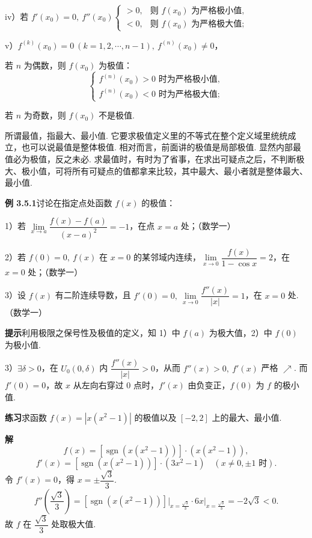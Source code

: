 \documentclass[UTF8,12pt,a4paper,fontset=fandol]{ctexart}
\begin{document}
iv）若 $f'(x_0)=0,\ f''(x_0)
\begin{cases}
>0, & \text{则 }f(x_0)\text{ 为严格极小值},\\
<0, & \text{则 }f(x_0)\text{ 为严格极大值};
\end{cases}$

v）$f^{(k)}(x_0)=0\ (k=1,2,\cdots,n-1),\ f^{(n)}(x_0)\ne0$，

若 $n$ 为偶数，则 $f(x_0)$ 为极值：
\[
\begin{cases}
f^{(n)}(x_0)>0\text{ 时为严格极小值},\\
f^{(n)}(x_0)<0\text{ 时为严格极大值};
\end{cases}
\]

若 $n$ 为奇数，则 $f(x_0)$ 不是极值.

所谓最值，指最大、最小值. 它要求极值定义里的不等式在整个定义域里统统成立，也可以说最值是整体极值. 相对而言，前面讲的极值是局部极值. 显然内部最值必为极值，反之未必. 求最值时，有时为了省事，在求出可疑点之后，不判断极大、极小值，可将所有可疑点的值都拿来比较，其中最大、最小者就是整体最大、最小值.

\noindent\textbf{例 3.5.1}\quad 讨论在指定点处函数 $f(x)$ 的极值：

1）若 $\lim\limits_{x\to a}\dfrac{f(x)-f(a)}{(x-a)^2}=-1$，在点 $x=a$ 处；（数学一）

2）若 $f(0)=0,\ f(x)$ 在 $x=0$ 的某邻域内连续，$\lim\limits_{x\to0}\dfrac{f(x)}{1-\cos x}=2$，在 $x=0$ 处；（数学一）

3）设 $f(x)$ 有二阶连续导数，且 $f'(0)=0,\ \lim\limits_{x\to0}\dfrac{f''(x)}{|x|}=1$，在 $x=0$ 处.（数学一）

\noindent\textbf{提示}\quad 利用极限之保号性及极值的定义，知 1）中 $f(a)$ 为极大值，2）中 $f(0)$ 为极小值.

3）$\exists\delta>0$，在 $U_0(0,\delta)$ 内 $\dfrac{f''(x)}{|x|}>0$，从而 $f''(x)>0,\ f'(x)$ 严格 $\nearrow$. 而 $f'(0)=0$，故 $x$ 从左向右穿过 0 点时，$f'(x)$ 由负变正，$f(0)$ 为 $f$ 的极小值.

\noindent\textbf{练习}\quad 求函数 $f(x)=|x(x^2-1)|$ 的极值以及 $[-2,2]$ 上的最大、最小值.

\noindent\textbf{解}\quad
\[
  f(x)=[\operatorname{sgn}(x(x^2-1))]\cdot(x(x^2-1)),
\]
\[
  f'(x)=[\operatorname{sgn}(x(x^2-1))]\cdot(3x^2-1)\quad(x\ne0,\pm1\text{ 时}).
\]
令 $f'(x)=0$，得 $x=\pm\dfrac{\sqrt3}{3}$.
\[
  f''\left(\frac{\sqrt3}{3}\right)
  =[\operatorname{sgn}(x(x^2-1))]\bigg|_{x=\frac{\sqrt3}{3}}\cdot6x\bigg|_{x=\frac{\sqrt3}{3}}
  =-2\sqrt3<0.
\]
故 $f$ 在 $\dfrac{\sqrt3}{3}$ 处取极大值.
\end{document}
